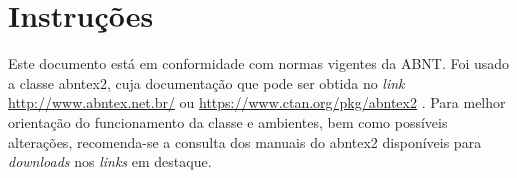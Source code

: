 \nocite{Rampazzo2005,Carvalho1989}

\section{Instruções}

Este documento está em conformidade com normas vigentes da ABNT. Foi usado a classe abntex2, cuja documentação que pode ser obtida no \textit{link}  \url{http://www.abntex.net.br/} ou \url{https://www.ctan.org/pkg/abntex2} . Para melhor orientação do funcionamento da classe e ambientes, bem como possíveis alterações, recomenda-se a consulta dos manuais do abntex2 disponíveis para \textit{downloads} nos \textit{links}  em destaque. 




